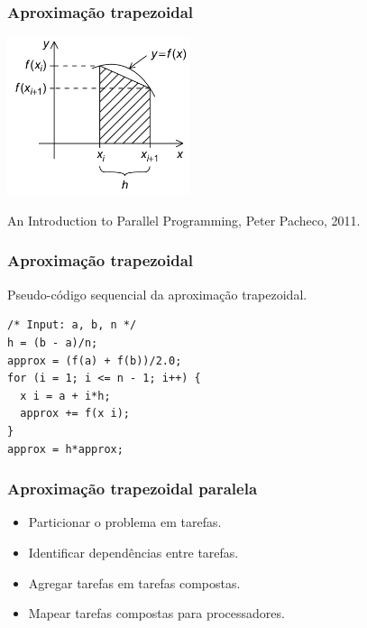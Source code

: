\documentclass[xcolor={usenames,dvipsnames},12pt,presentation,aspectratio=169]{beamer}
\begin{document}
\begin{frame}
  \frametitle{Aproximação trapezoidal}
  \vspace{-5mm}
  \begin{center}
	\includegraphics[width=0.4\textwidth]{trap1.png}
  \end{center}
  \vspace{-4mm}
  {\tiny An Introduction to Parallel Programming, Peter Pacheco, 2011.}
\end{frame}
\begin{frame}[fragile]
  \frametitle{Aproximação trapezoidal}
  Pseudo-código sequencial da aproximação trapezoidal.
\begin{center}
\begin{minipage}{0.95\textwidth}
  \begin{verbatim}
/* Input: a, b, n */
h = (b - a)/n;
approx = (f(a) + f(b))/2.0;
for (i = 1; i <= n - 1; i++) {
  x i = a + i*h;
  approx += f(x i);
}
approx = h*approx;
  \end{verbatim}
\end{minipage}
\end{center}
\end{frame}
\begin{frame}
  \frametitle{Aproximação trapezoidal paralela}
  \begin{itemize}
    \item Particionar o problema em tarefas.
    \item Identificar dependências entre tarefas.
    \item Agregar tarefas em tarefas compostas.
    \item Mapear tarefas compostas para processadores.
  \end{itemize} 
\end{frame}
\end{document}
